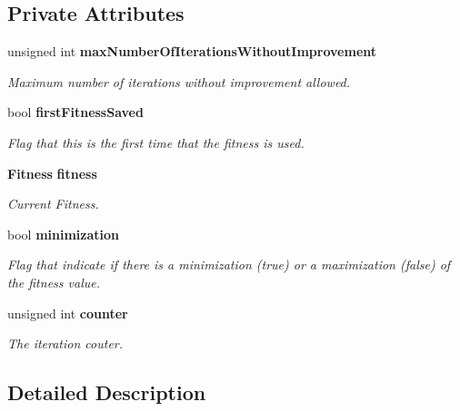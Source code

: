 \subsection*{Private Attributes}
\begin{CompactItemize}
\item 
unsigned int {\bf maxNumberOfIterationsWithoutImprovement}\label{classmo_no_fit_impr_sol_continue_03612ffc3af9d943c1b1d2cde09d461b}

\begin{CompactList}\small\item\em Maximum number of iterations without improvement allowed. \item\end{CompactList}\item 
bool {\bf firstFitnessSaved}\label{classmo_no_fit_impr_sol_continue_ca3591e47a075b59e0826f31234c71ef}

\begin{CompactList}\small\item\em Flag that this is the first time that the fitness is used. \item\end{CompactList}\item 
{\bf Fitness} {\bf fitness}\label{classmo_no_fit_impr_sol_continue_3d3d2b43a4dd73e38689cc0018d44ee7}

\begin{CompactList}\small\item\em Current Fitness. \item\end{CompactList}\item 
bool {\bf minimization}
\begin{CompactList}\small\item\em Flag that indicate if there is a minimization (true) or a maximization (false) of the fitness value. \item\end{CompactList}\item 
unsigned int {\bf counter}\label{classmo_no_fit_impr_sol_continue_46fc008a8f7cd06dcaaeb4016b433adb}

\begin{CompactList}\small\item\em The iteration couter. \item\end{CompactList}\end{CompactItemize}


\subsection{Detailed Description}
